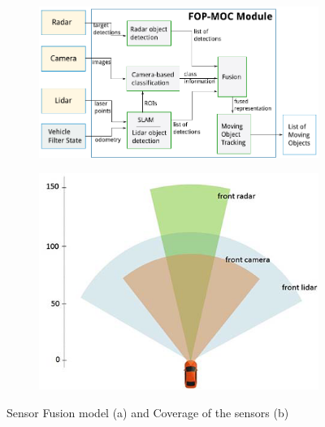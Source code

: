 \begin{figure}
    \centering
    \begin{subfigure}[b]{0.4\textwidth}
        \includegraphics[width=\textwidth]{src/pic/PS.png}
        \caption{}
        \label{fig:PS}
    \end{subfigure}
    \begin{subfigure}[b]{0.4\textwidth}
        \includegraphics[width=\textwidth]{src/pic/sensor_covarage_front.png}
        \caption{}
        \label{fig:sensorcovarage}
    \end{subfigure}
    \caption{Sensor Fusion model (a) and Coverage of the sensors (b)}
    \label{fig:Sensor_Fusion_1}
\end{figure}

